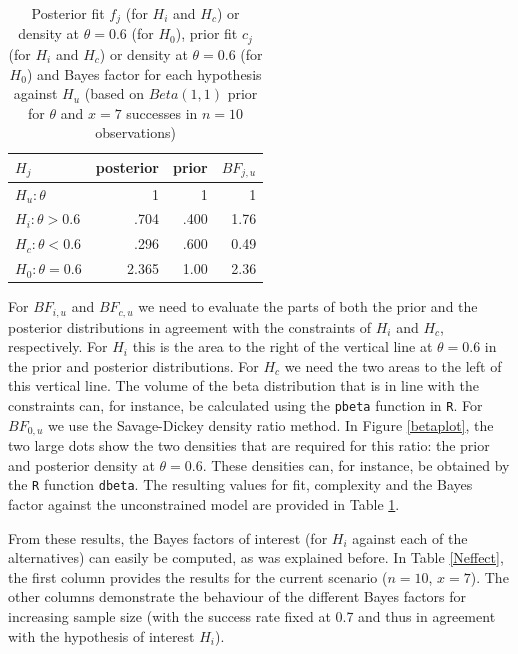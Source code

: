 \documentclass[11pt,reqno]{article}
\begin{document}
\begin{table}[!h]
\caption{Posterior fit $f_j$ (for $H_i$ and $H_c$) or density at $\theta=0.6$ (for $H_0$), prior fit $c_j$ (for $H_i$ and $H_c$) or density at $\theta=0.6$ (for $H_0$) and Bayes factor for each hypothesis against $H_u$ (based on $Beta(1,1)$ prior for $\theta$ and $x=7$ successes in $n=10$ observations)}
\label{calcBF}
  \centering
     \begin{tabular}{lrrr}\hline
$H_j$                 & posterior   & prior  & $BF_{j,u}$   \\ \hline
$H_u: \theta$        & 1     & 1     & 1       \\
$H_i: \theta>0.6$    & .704  & .400  & 1.76    \\
$H_c: \theta<0.6$    & .296  & .600  & 0.49    \\
$H_0: \theta=0.6$    & 2.365 & 1.00  & 2.36    \\ \hline
\end{tabular}
\end{table}


For $BF_{i,u}$ and $BF_{c,u}$ we need to evaluate the parts of both the prior and the posterior distributions in agreement with the constraints of $H_i$ and $H_c$, respectively.
For $H_i$ this is the area to the right of the vertical line at $\theta=0.6$ in the prior and posterior distributions. For $H_c$ we need the two areas to the left of this vertical line.
The volume of the beta distribution that is in line with the constraints can, for instance, be calculated using the \verb"pbeta" function in \verb"R".
For $BF_{0,u}$ we use the Savage-Dickey density ratio method. In Figure \ref{betaplot}, the two large dots show the two densities that are required for this ratio: the prior and posterior density at $\theta=0.6$. These densities can, for instance, be obtained by the \verb"R" function \verb"dbeta". The resulting values for fit, complexity and the Bayes factor against the unconstrained model are provided in Table \ref{calcBF}.

From these results, the Bayes factors of interest (for $H_i$ against each of the alternatives) can easily be computed, as was explained before.
In Table \ref{Neffect}, the first column provides the results for the current scenario ($n=10$, $x=7$). The other columns demonstrate the behaviour of the different Bayes factors for increasing sample size (with the success rate fixed at 0.7 and thus in agreement with the hypothesis of interest $H_i$).
\end{document}
